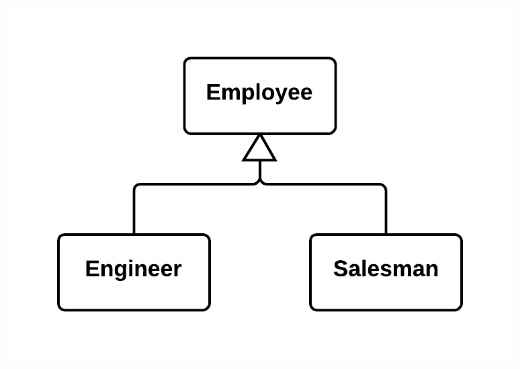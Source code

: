 \documentclass[11pt,a4paper,oneside]{book}
\begin{document}
\begin{itemize}
    \centering \includegraphics[scale=0.2]{replacetypecodewithsubclassessolution}
\end{itemize}
    
\end{document}
